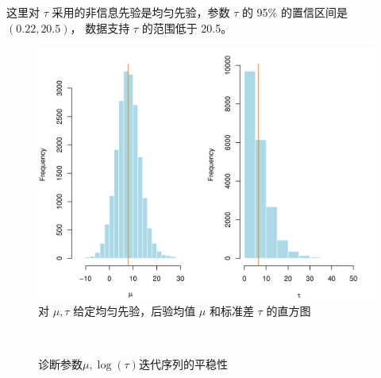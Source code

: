 \documentclass[12pt,a4paper,UTF8,twoside]{book}
\theoremstyle{definition}
\theoremstyle{definition}
\theoremstyle{definition}
\theoremstyle{remark}
\begin{document}
这里对 \(\tau\) 采用的非信息先验是均匀先验，参数 \(\tau\) 的 95\% 的置信区间是 \((0.22,20.5)\)， 数据支持 \(\tau\) 的范围低于 20.5。

\begin{figure}

{\centering \includegraphics[width=0.7\linewidth]{figures/posterior_mu_tau} 

}

\caption{对 $\mu,\tau$ 给定均匀先验，后验均值 $\mu$ 和标准差 $\tau$ 的直方图}\label{fig:posterior-mu-tau}
\end{figure}
\begin{figure}[!htb]

{\centering {}\\

}

\caption{诊断参数$\mu,\log(\tau)$迭代序列的平稳性}\label{fig:diagnostic}
\end{figure}
\end{document}
